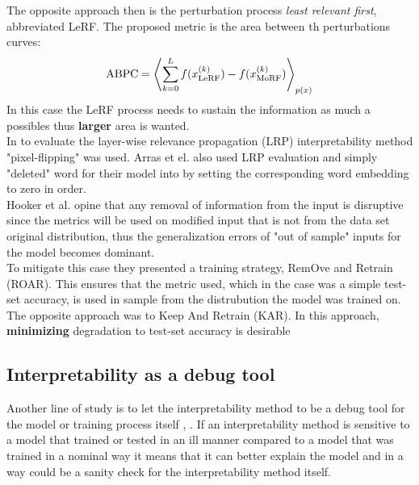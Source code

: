 \documentclass[12pt]{report}
\begin{document}
The opposite approach then is the perturbation process \textit{least relevant first}, abbreviated LeRF. The proposed metric is the area between th perturbations curves:
\begin{align*}
	\text{ABPC} = \Braket{	\sum_{k=0}^{L}f(x_{\text{LeRF}}^{(k)}) -f(x_{\text{MoRF}}^{(k)})}_{p(x)}
\end{align*}
In this case the LeRF process needs to sustain the information as much a possibles thus \textbf{larger} area is wanted.\\

In \cite{LRP} to evaluate the layer-wise relevance propagation (LRP) interpretability method "pixel-flipping" was used.  Arras et el. \cite{DBLP:journals/corr/ArrasHMMS16a} also used LRP evaluation and simply "deleted" word for their model into by setting the corresponding word embedding to zero in order. \\

Hooker et al.  \cite{https://doi.org/10.48550/arxiv.1806.10758} opine that any removal of information from the input is disruptive since the metrics will be used on modified input that is not from the data set original distribution, thus the generalization errors of "out of sample" inputs for the model becomes dominant. \\

To mitigate this case they presented a training strategy, RemOve and Retrain (ROAR). This ensures that the metric used, which in the case was a simple test-set accuracy, is used in sample from the distrubution the model was trained on. The opposite approach was to Keep And Retrain (KAR). In this approach, \textbf{minimizing} degradation to test-set accuracy is desirable\\


\subsection{Interpretability as a debug tool}

Another line of study is to let the interpretability method to be a debug tool for the model or training process itself \cite{https://doi.org/10.48550/arxiv.1810.03292}, \cite{DBLP:journals/corr/abs-2011-05429}. If an interpretability method is sensitive to a model that trained or tested in an ill manner compared to a model that was trained in a nominal way it means that it can better explain the model and in a way could be a sanity check for the interpretability method itself. \\
\end{document}
